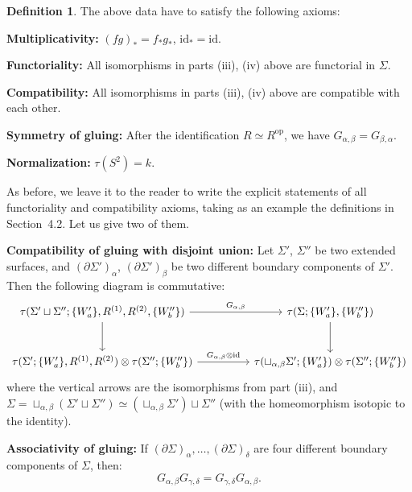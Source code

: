 \documentclass[11pt]{article}
\theoremstyle{definition}
\newtheorem{definition}[theorem]{Definition}
\begin{document}
\begin{definition}
The above data have to satisfy the following axioms:

\medskip
\noindent \textbf{Multiplicativity:} $(fg)_* = f_* g_*$, $\mathrm{id}_* = \mathrm{id}$.

\smallskip
\noindent \textbf{Functoriality:} All isomorphisms in parts (iii), (iv) above are functorial in $\Sigma$.


\noindent \textbf{Compatibility:} All isomorphisms in parts (iii), (iv) above are compatible with each other.

\smallskip
\noindent \textbf{Symmetry of gluing:} After the identification $R \simeq R^{\mathrm{op}}$, we have $G_{\alpha,\beta} = G_{\beta,\alpha}$.

\smallskip
\noindent \textbf{Normalization:} $\tau(S^2) = k$.

\bigskip

As before, we leave it to the reader to write the explicit statements of all functoriality and compatibility axioms, taking as an example the definitions in Section~4.2. Let us give two of them.

\medskip
\noindent \textbf{Compatibility of gluing with disjoint union:} Let $\Sigma'$, $\Sigma''$ be two extended surfaces, and $(\partial \Sigma')_\alpha$, $(\partial \Sigma')_\beta$ be two different boundary components of $\Sigma'$. Then the following diagram is commutative:
\[
\begin{tikzcd}[column sep=huge, row sep=large]
\tau(\Sigma' \sqcup \Sigma''; \{W_a'\}, R^{(1)}, R^{(2)}, \{W_b''\}) \arrow[r, "G_{\alpha,\beta}"] \arrow[d]
& \tau(\Sigma; \{W_a'\}, \{W_b''\}) \arrow[d] \\
\tau(\Sigma'; \{W_a'\}, R^{(1)}, R^{(2)}) \otimes \tau(\Sigma''; \{W_b''\}) \arrow[r, "G_{\alpha,\beta} \otimes \mathrm{id}"]
& \tau(\sqcup_{\alpha,\beta}\Sigma'; \{W_a'\}) \otimes \tau(\Sigma''; \{W_b''\})
\end{tikzcd}
\]
where the vertical arrows are the isomorphisms from part (iii), and $\Sigma = \sqcup_{\alpha,\beta}(\Sigma' \sqcup \Sigma'') \simeq (\sqcup_{\alpha,\beta}\Sigma') \sqcup \Sigma''$ (with the homeomorphism isotopic to the identity).


\noindent \textbf{Associativity of gluing:} If $(\partial \Sigma)_\alpha, \dots, (\partial \Sigma)_\delta$ are four different boundary components of $\Sigma$, then:
\begin{equation}
G_{\alpha,\beta} G_{\gamma,\delta} = G_{\gamma,\delta} G_{\alpha,\beta}. \tag{5.1.3}
\end{equation}


\end{definition}
\end{document}
